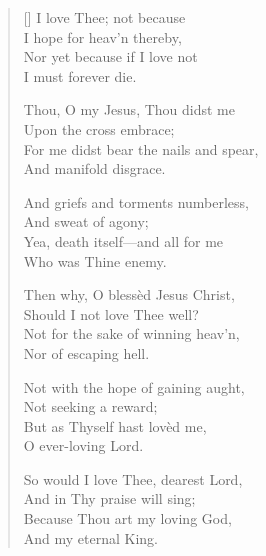 \newHymn
{}

\begin{verse}[\versewidth]
 I love Thee; not because\\
I hope for heav'n thereby,\\
Nor yet because if I love not\\
I must forever die.

Thou, O my Jesus, Thou didst me\\
Upon the cross embrace;\\
For me didst bear the nails and spear,\\
And manifold disgrace.


And griefs and torments numberless,\\
And sweat of agony;\\
Yea, death itself---and all for me\\
Who was Thine enemy.

Then why, O blessèd Jesus Christ,\\
Should I not love Thee well?\\
Not for the sake of winning heav'n,\\
Nor of escaping hell.

Not with the hope of gaining aught,\\
Not seeking a reward;\\
But as Thyself hast lovèd me,\\
O ever-loving Lord.

So would I love Thee, dearest Lord,\\
And in Thy praise will sing;\\
Because Thou art my loving God,\\
And my eternal King.

\end{verse}



